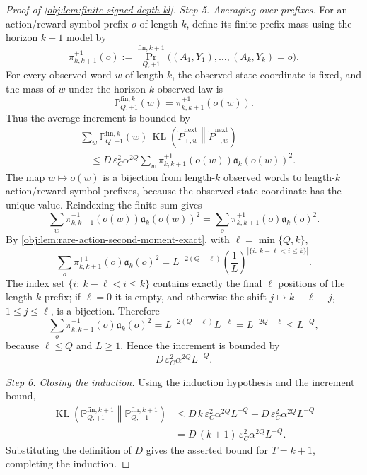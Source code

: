 \documentclass[11pt]{article}
\begin{document}
\begin{proof}[Proof of \cref{obj:lem:finite-signed-depth-kl}]
\emph{Step 5. Averaging over prefixes.}
For an action/reward-symbol prefix \(o\) of length \(k\), define its finite prefix mass using the horizon \(k+1\) model by
\[
\pi_{k,k+1}^{+1}(o)
:=
\Pr_{Q,+1}^{\mathrm{fin},k+1}\!
\bigl((A_1,Y_1),\ldots,(A_k,Y_k)=o\bigr).
\]
For every observed word \(w\) of length \(k\), the observed state coordinate is fixed, and the mass of \(w\) under the horizon-\(k\) observed law is
\[
\mathbb P_{Q,+1}^{\mathrm{fin},k}(w)
=
\pi_{k,k+1}^{+1}(o(w)).
\]
Thus the average increment is bounded by
\[
\begin{aligned}
&\sum_{w}
\mathbb P_{Q,+1}^{\mathrm{fin},k}(w)\,
\operatorname{KL}\!\left(\widetilde P_{+,w}^{\mathrm{next}}\middle\|\widetilde P_{-,w}^{\mathrm{next}}\right)\\
&\quad\le
D\,\varepsilon_C^2\alpha^{2Q}
\sum_{w}
\pi_{k,k+1}^{+1}(o(w))\mathfrak a_k(o(w))^2 .
\end{aligned}
\]
The map \(w\mapsto o(w)\) is a bijection from length-\(k\) observed words to length-\(k\) action/reward-symbol prefixes, because the observed state coordinate has the unique value.  Reindexing the finite sum gives
\[
\sum_{w}
\pi_{k,k+1}^{+1}(o(w))\mathfrak a_k(o(w))^2
=
\sum_o \pi_{k,k+1}^{+1}(o)\mathfrak a_k(o)^2 .
\]
By \cref{obj:lem:rare-action-second-moment-exact}, with \(\ell=\min\{Q,k\}\),
\[
\sum_o \pi_{k,k+1}^{+1}(o)\mathfrak a_k(o)^2
=
L^{-2(Q-\ell)}
\left(\frac{1}{L}\right)^{|\{i:\ k-\ell<i\le k\}|}.
\]
The index set \(\{i:\ k-\ell<i\le k\}\) contains exactly the final \(\ell\) positions of the length-\(k\) prefix; if \(\ell=0\) it is empty, and otherwise the shift \(j\mapsto k-\ell+j\), \(1\le j\le\ell\), is a bijection.  Therefore
\[
\sum_o \pi_{k,k+1}^{+1}(o)\mathfrak a_k(o)^2
=
L^{-2(Q-\ell)}L^{-\ell}
=
L^{-2Q+\ell}
\le L^{-Q},
\]
because \(\ell\le Q\) and \(L\ge 1\).  Hence the increment is bounded by
\[
D\,\varepsilon_C^2\alpha^{2Q}L^{-Q}.
\] %

\emph{Step 6. Closing the induction.}
Using the induction hypothesis and the increment bound,
\[
\begin{aligned}
\operatorname{KL}\!\left(\mathbb P_{Q,+1}^{\mathrm{fin},k+1}
 \middle\|\mathbb P_{Q,-1}^{\mathrm{fin},k+1}\right)
&\le
D\,k\,\varepsilon_C^2\alpha^{2Q}L^{-Q}
+
D\,\varepsilon_C^2\alpha^{2Q}L^{-Q} \\
&=
D\,(k+1)\,\varepsilon_C^2\alpha^{2Q}L^{-Q}.
\end{aligned}
\]
Substituting the definition of \(D\) gives the asserted bound for \(T=k+1\), completing the induction. %
\end{proof}
\end{document}
